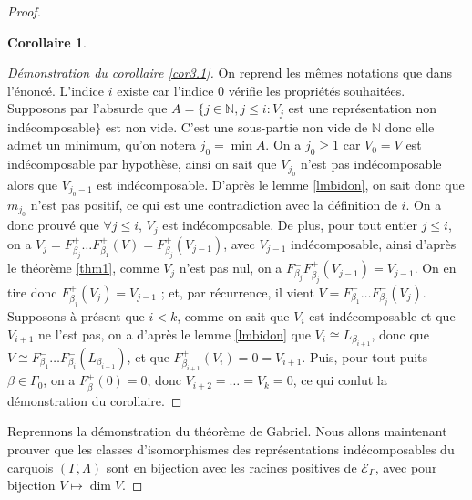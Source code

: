 \documentclass[a4paper,11pt]{article}
\newtheorem{cor}[thm]{Corollaire}%
\newcommand{\EG}{\mathscr{E}_\Gamma}
\begin{document}
\begin{proof}
\begin{cor}
	\end{cor}
	\begin{proof}[Démonstration du corollaire \ref{cor3.1}]
		On reprend les mêmes notations que dans l'énoncé. L'indice $i$ existe car l'indice $0$ vérifie les propriétés souhaitées. Supposons par l'absurde que $A=\{j\in\mathbb N, j\leq i : V_j$ est une représentation non indécomposable$\}$ est non vide. C'est une sous-partie non vide de $\mathbb N$ donc elle admet un minimum, qu'on notera $j_0=\min A$. On a $j_0\geq 1$ car $V_0=V$ est indécomposable par hypothèse, ainsi on sait que $V_{j_0}$ n'est pas indécomposable alors que $V_{j_0-1}$ est indécomposable. D'après le lemme \ref{lmbidon}, on sait donc que $m_{j_0}$ n'est pas positif, ce qui est une contradiction avec la définition de $i$. On a donc prouvé que $\forall j\leq i$, $V_j$ est indécomposable. De plus, pour tout entier $j\leq i$, on a $V_j=F_{\beta_j}^+\dots F_{\beta_1}^+(V)=F_{\beta_j}^+(V_{j-1})$, avec $V_{j-1}$ indécomposable, ainsi d'après le théorème \ref{thm1}, comme $V_j$ n'est pas nul, on a $F_{\beta_j}^-F_{\beta_j}^+(V_{j-1})=V_{j-1}$. On en tire donc $F_{\beta_j}^+(V_j)=V_{j-1}$ ; et, par récurrence, il vient $V=F_{\beta_1}^-\dots F_{\beta_j}^-(V_j)$. Supposons à présent que $i<k$, comme on sait que $V_i$ est indécomposable et que $V_{i+1}$ ne l'est pas, on a d'après le lemme \ref{lmbidon} que $V_i\cong L_{\beta_{i+1}}$, donc que $V\cong F_{\beta_1}^-\dots F_{\beta_i}^-(L_{\beta_{i+1}})$, et que $F_{\beta_{i+1}}^+(V_i)=0=V_{i+1}$. Puis, pour tout puits $\beta\in\Gamma_0$, on a $F_\beta^+(0)=0$, donc $V_{i+2}=\dots=V_k=0$, ce qui conlut la démonstration du corollaire.
	\end{proof}
	Reprennons la démonstration du théorème de Gabriel. Nous allons maintenant prouver que les classes d'isomorphismes des représentations indécomposables du carquois $(\Gamma,\Lambda)$ sont en bijection avec les racines positives de $\EG$, avec pour bijection $V\mapsto\dim V$.


\end{proof}
\end{document}
